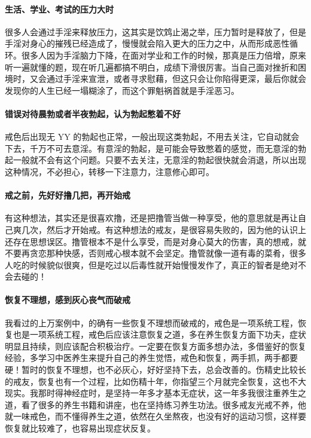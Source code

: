 \paragraph{生活、学业、考试的压力大时}

很多人会通过手淫来释放压力，这其实是饮鸩止渴之举，压力暂时是释放了，但是手淫对身心的摧残已经造成了，慢慢就会陷入更大的压力之中，从而形成恶性循环。很多人因为手淫脑力下降，在面对学业和工作的时候，那真是压力倍增，原来听一遍就懂的题，现在听几遍都搞不明白，成绩下滑很厉害。当自己面对挫折和困境时，又会通过手淫来宣泄，或者寻求慰藉，但这只会让你陷得更深，最后你就会发现你的人生已经一塌糊涂了，而这个罪魁祸首就是手淫恶习。

\paragraph{错误对待晨勃或者半夜勃起，认为勃起憋着不好}

戒色后出现无 YY 的勃起也正常，一般出现这类勃起，不用去关注，它自动就会下去，千万不可去意淫。有意淫的勃起，是可能会导致憋着的感觉，而无意淫的勃起一般就不会有这个问题。只要不去关注，无意淫的勃起很快就会消退，所以出现这种情况，不必担心，转移一下注意力，注意修心即可。

\paragraph{戒之前，先好好撸几把，再开始戒}

有这种想法，其实还是很喜欢撸，还是把撸管当做一种享受，他的意思就是再让自己爽几次，然后才开始戒。有这种想法的戒友，是很容易失败的，因为他的认识上还存在思想误区。撸管根本不是什么享受，而是对身心莫大的伤害，真的想戒，就不要再贪恋那种快感，否则戒心根本就不会坚定。撸管就像一道有毒的菜肴，很多人吃的时候貌似很爽，但是吃过以后毒性就开始慢慢发作了，真正的智者是绝对不会去碰的！

\paragraph{恢复不理想，感到灰心丧气而破戒}

我看过的上万案例中，的确有一些恢复不理想而破戒的，戒色是一项系统工程，恢复也是一项系统工程，戒色后应该注意恢复之道，多在养生恢复方面下功夫，症状明显且持续，则应该配合积极治疗。一定要在恢复方面多想办法，多借鉴好的恢复经验，多学习中医养生来提升自己的养生觉悟，戒色和恢复，两手抓，两手都要硬！暂时的恢复不理想，也不必灰心，好好坚持下去，总会改善的。伤精史比较长的戒友，恢复也有一个过程，比如伤精十年，你指望三个月就完全恢复，这也不大现实。我那时得神经症时，是坚持一年多才基本无症状，这一年多我很注重养生之道，看了很多的养生书籍和讲座，也在坚持练习养生功法。很多戒友光戒不养，他就一味戒色，而不懂得养生之道，依然在久坐熬夜，也没有好的运动习惯，这样要恢复就比较难了，也容易出现症状反复。

